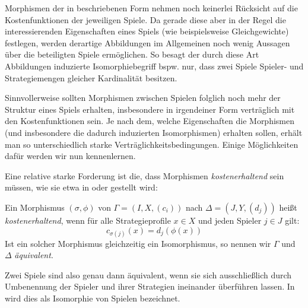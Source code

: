 Morphismen der in  beschriebenen Form nehmen noch keinerlei Rücksicht auf die Kostenfunktionen der jeweiligen Spiele. Da gerade diese aber in der Regel die interessierenden Eigenschaften eines Spiels (wie beispielsweise Gleichgewichte) festlegen, werden derartige Abbildungen im Allgemeinen noch wenig Aussagen über die beteiligten Spiele ermöglichen. So besagt der durch diese Art Abbildungen induzierte Isomorphiebegriff bspw. nur, dass zwei Spiele Spieler- und Strategiemengen gleicher Kardinalität besitzen.

Sinnvollerweise sollten Morphismen zwischen Spielen folglich noch mehr der Struktur eines Spiels erhalten, insbesondere in irgendeiner Form \glqq verträglich\grqq{} mit den Kostenfunktionen sein. Je nach dem, welche Eigenschaften die Morphismen (und insbesondere die dadurch induzierten Isomorphismen) erhalten sollen, erhält man so unterschiedlich starke Verträglichkeitsbedingungen. Einige Möglichkeiten dafür werden wir nun kennenlernen.

Eine relative starke Forderung ist die, dass Morphismen \emph{kostenerhaltend} sein müssen, wie sie etwa in \cite[S. 288f]{Nash} oder \cite[Abschnitt 2.1]{ReprOfFiniteGamesAsNCG} gestellt wird:

\begin{defn}
	Ein Morphismus $(\sigma, \phi)$ von $\Gamma = (I, X, (c_i))$ nach $\Delta = (J, Y, (d_j))$ heißt \emph{kostenerhaltend}, wenn für alle Strategieprofile $x \in X$ und jeden Spieler $j \in J$ gilt:
		\[c_{\sigma(j)}(x) = d_j(\phi(x)) \]
	Ist ein solcher Morphismus gleichzeitig ein Isomorphismus, so nennen wir $\Gamma$ und $\Delta$ \emph{äquivalent}.
\end{defn}

\begin{bem}
	Zwei Spiele sind also genau dann äquivalent, wenn sie sich ausschließlich durch Umbenennung der Spieler und ihrer Strategien ineinander überführen lassen. In \cite[S. 133]{MonShap} wird dies als Isomorphie von Spielen bezeichnet.
\end{bem}

